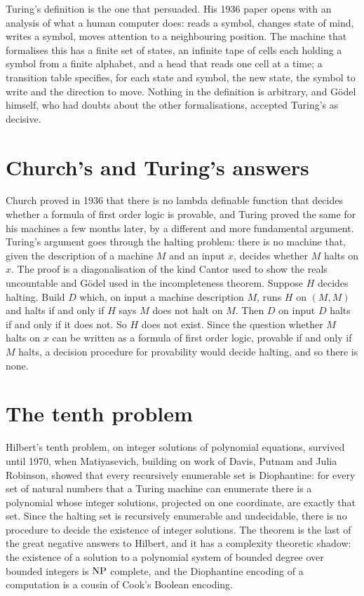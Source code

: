 Turing's definition is the one that persuaded. His 1936 paper opens with an analysis of what a human computer does: reads a symbol, changes state of mind, writes a symbol, moves attention to a neighbouring position. The machine that formalises this has a finite set of states, an infinite tape of cells each holding a symbol from a finite alphabet, and a head that reads one cell at a time; a transition table specifies, for each state and symbol, the new state, the symbol to write and the direction to move. Nothing in the definition is arbitrary, and G\"odel himself, who had doubts about the other formalisations, accepted Turing's as decisive.

\section{Church's and Turing's answers}

Church proved in 1936 that there is no lambda definable function that decides whether a formula of first order logic is provable, and Turing proved the same for his machines a few months later, by a different and more fundamental argument. Turing's argument goes through the halting problem: there is no machine that, given the description of a machine $M$ and an input $x$, decides whether $M$ halts on $x$. The proof is a diagonalisation of the kind Cantor used to show the reals uncountable and G\"odel used in the incompleteness theorem. Suppose $H$ decides halting. Build $D$ which, on input a machine description $M$, runs $H$ on $(M, M)$ and halts if and only if $H$ says $M$ does not halt on $M$. Then $D$ on input $D$ halts if and only if it does not. So $H$ does not exist. Since the question whether $M$ halts on $x$ can be written as a formula of first order logic, provable if and only if $M$ halts, a decision procedure for provability would decide halting, and so there is none.

\section{The tenth problem}

Hilbert's tenth problem, on integer solutions of polynomial equations, survived until 1970, when Matiyasevich, building on work of Davis, Putnam and Julia Robinson, showed that every recursively enumerable set is Diophantine: for every set of natural numbers that a Turing machine can enumerate there is a polynomial whose integer solutions, projected on one coordinate, are exactly that set. Since the halting set is recursively enumerable and undecidable, there is no procedure to decide the existence of integer solutions. The theorem is the last of the great negative answers to Hilbert, and it has a complexity theoretic shadow: the existence of a solution to a polynomial system of bounded degree over bounded integers is $\mathrm{NP}$ complete, and the Diophantine encoding of a computation is a cousin of Cook's Boolean encoding.

